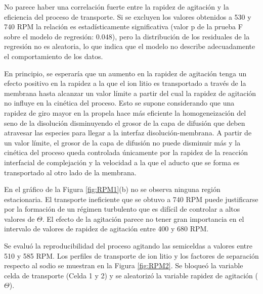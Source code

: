 No parece haber una correlación fuerte entre la rapidez de agitación y la eficiencia del proceso de transporte. Si se excluyen los valores obtenidos a 530 y 740 RPM la relación es estadísticamente significativa (valor p de la prueba F sobre el modelo de regresión: 0.048), pero la distribución de los residuales de la regresión no es aleatoria, lo que indica que el modelo no describe adecuadamente el comportamiento de los datos. 

En principio, se esperaría que un aumento en la rapidez de agitación tenga un efecto positivo en la rapidez a la que el ion litio es transportado a través de la membrana hasta alcanzar un valor límite a partir del cual la rapidez de agitación no influye en la cinética del proceso. Esto se supone considerando que una rapidez de giro mayor en la propela hace más eficiente la homogeneización del seno de la disolución disminuyendo el grosor de la capa de difusión que deben atravesar las especies para llegar a la interfaz disolución-membrana. A partir de un valor límite, el grosor de la capa de difusión no puede disminuir más y la cinética del proceso queda controlada únicamente por la rapidez de la reacción interfacial de complejación y la velocidad a la que el aducto que se forma es transportado al otro lado de la membrana. 

En el gráfico de la Figura \ref{fig:RPM1}(b) no se observa ninguna región estacionaria. El transporte ineficiente que se obtuvo a 740 RPM puede justificarse por la formación de un régimen turbulento que es difícil de controlar a altos valores de $\Theta$. El efecto de la agitación parece no tener gran importancia en el intervalo de valores de rapidez de agitación entre 400 y 680 RPM.

Se evaluó la reproducibilidad del proceso agitando las semiceldas a valores entre 510 y 585 \ac{RPM}. Los perfiles de transporte de ion litio y los factores de separación respecto al sodio se muestran en la Figura \ref{fig:RPM2}. Se bloqueó la variable {celda de transporte} (Celda 1 y 2) y se aleatorizó la variable {rapidez de agitación} ($\Theta$).

